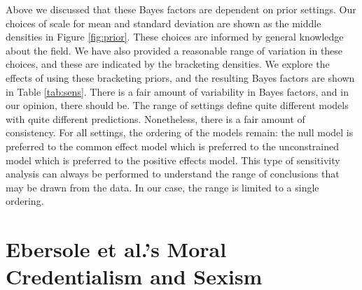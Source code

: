 \documentclass[english,man]{apa6}
\theoremstyle{definition}
\theoremstyle{definition}
\theoremstyle{remark}
\begin{document}
Above we discussed that these Bayes factors are dependent on prior
settings. Our choices of scale for mean and standard deviation are shown
as the middle densities in Figure \ref{fig:prior}. These choices are
informed by general knowledge about the field. We have also provided a
reasonable range of variation in these choices, and these are indicated
by the bracketing densities. We explore the effects of using these
bracketing priors, and the resulting Bayes factors are shown in Table
\ref{tab:sens}. There is a fair amount of variability in Bayes factors,
and in our opinion, there should be. The range of settings define quite
different models with quite different predictions. Nonetheless, there is
a fair amount of consistency. For all settings, the ordering of the
models remain: the null model is preferred to the common effect model
which is preferred to the unconstrained model which is preferred to the
positive effects model. This type of sensitivity analysis can always be
performed to understand the range of conclusions that may be drawn from
the data. In our case, the range is limited to a single ordering.

\section{Ebersole et al.'s Moral Credentialism and
Sexism}\label{ebersole-et-al.s-moral-credentialism-and-sexism}
\end{document}

